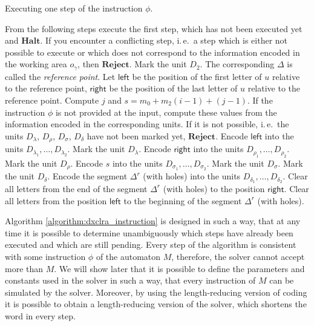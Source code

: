\begin{algorithm}
\caption{Executing one step of the instruction $\phi$.}
\label{algorithm:dxclra_instruction}
\DontPrintSemicolon
\LinesNumbered
{}
\nonl From the following steps execute the first step, which has not been executed yet and $\textbf{Halt}$. If you encounter a conflicting step, i.\,e.\ a step which is either not possible to execute or which does not correspond to the information encoded in the working area $o_{\gamma}$, then $\textbf{Reject}$.\;
Mark the unit $D_2$. The corresponding $\Delta$ is called the {\em reference point}.\label{algorithm:dxclra_instruction_step_1}\;
\nonl Let $\textsf{left}$ be the position of the first letter of $u$ relative to the reference point, $\textsf{right}$ be the position of the last letter of $u$ relative to the reference point. Compute $j$ and $s = m_0 + m_2 (i - 1) + (j - 1)$. If the instruction $\phi$ is not provided at the input, compute these values from the information encoded in the corresponding units. If it is not possible, i.\,e.\ the units $D_{\lambda}$, $D_{\rho}$, $D_{\sigma}$, $D_{\delta}$ have not been marked yet, $\textbf{Reject}$.\;
Encode $\textsf{left}$ into the units $D_{\lambda_1}, \ldots, D_{\lambda_2}$. Mark the unit $D_{\lambda}$.\label{algorithm:dxclra_instruction_step_2}\;
Encode $\textsf{right}$ into the units $D_{\rho_1}, \ldots, D_{\rho_2}$. Mark the unit  $D_{\rho}$.\label{algorithm:dxclra_instruction_step_3}\;
Encode $s$ into the units $D_{\sigma_1}, \ldots, D_{\sigma_2}$. Mark the unit $D_{\sigma}$.\label{algorithm:dxclra_instruction_step_4}\;
Mark the unit $D_{\delta}$.\label{algorithm:dxclra_instruction_step_5}\;
Encode the segment $\Delta^r$ (with holes) into the units $D_{\delta_1}, \ldots, D_{\delta_2}$.\label{algorithm:dxclra_instruction_step_6}\;
Clear all letters from the end of the segment $\Delta^r$ (with holes) to the position $\textsf{right}$.\label{algorithm:dxclra_instruction_step_7}\;
Clear all letters from the position $\textsf{left}$ to the beginning of the segment $\Delta^r$ (with holes).\label{algorithm:dxclra_instruction_step_8}\;
\end{algorithm}

Algorithm \ref{algorithm:dxclra_instruction} is designed in such a way, that at any time it is possible to determine unambiguously which steps have already been executed and which are still pending. Every step of the algorithm is consistent with some instruction $\phi$ of the automaton $M$,  therefore, the solver cannot accept more than $M$. We will show later that it is possible to define the parameters and constants used in the solver in such a way, that every instruction of $M$ can be simulated by the solver. Moreover, by using the length-reducing version of coding it is possible to obtain a length-reducing version of the solver, which shortens the word in every step.

